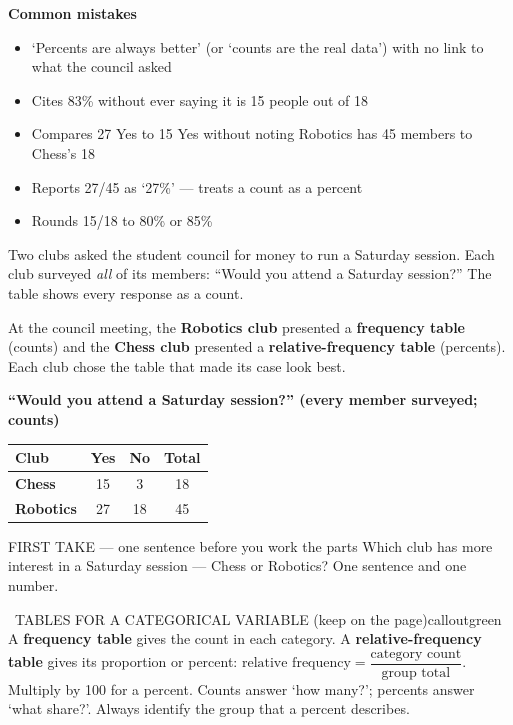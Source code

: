 \documentclass[11pt]{article}
\begin{document}
\textbf{Common mistakes}
\begin{itemize}[leftmargin=1.5em,itemsep=2pt,topsep=2pt]
  \item `Percents are always better' (or `counts are the real data') with no link to what the council asked
  \item Cites 83\% without ever saying it is 15 people out of 18
  \item Compares 27 Yes to 15 Yes without noting Robotics has 45 members to Chess's 18
  \item Reports 27/45 as `27\%' --- treats a count as a percent
  \item Rounds 15/18 to 80\% or 85\%
\end{itemize}

\clearpage
{}

Two clubs asked the student council for money to run a Saturday session. Each club surveyed \emph{all} of its members: ``Would you attend a Saturday session?'' The table shows every response as a count.\par\smallskip At the council meeting, the \textbf{Robotics club} presented a \textbf{frequency table} (counts) and the \textbf{Chess club} presented a \textbf{relative-frequency table} (percents). Each club chose the table that made its case look best.\par
\begin{center}
\textbf{``Would you attend a Saturday session?'' (every member surveyed; counts)}\par\smallskip
\begin{tabular}{|l|c|c|c|}
\hline
\textbf{Club} & \textbf{Yes} & \textbf{No} & \textbf{Total} \\ \hline
\textbf{Chess} & 15 & 3 & 18 \\ \hline
\textbf{Robotics} & 27 & 18 & 45 \\ \hline
\end{tabular}
\end{center}
\begin{firsttakebox}{FIRST TAKE --- one sentence before you work the parts}
Which club has more interest in a Saturday session --- Chess or Robotics? One sentence and one number.\par
{}
\end{firsttakebox}

\begin{callout}{\IconBook\ TABLES FOR A CATEGORICAL VARIABLE (keep on the page)}{calloutgreen}
A \textbf{frequency table} gives the count in each category. A \textbf{relative-frequency table} gives its proportion or percent: $\text{relative frequency}=\dfrac{\text{category count}}{\text{group total}}$. Multiply by 100 for a percent. Counts answer `how many?'; percents answer `what share?'. Always identify the group that a percent describes.
\end{callout}
\end{document}
